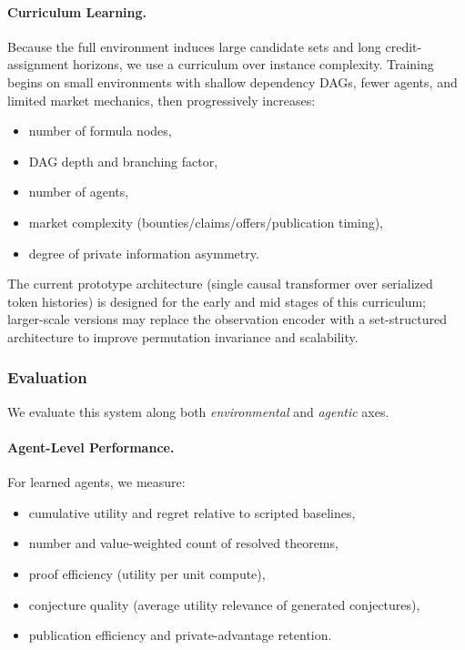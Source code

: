 \documentclass[letterpaper]{article} %
\begin{document}
\paragraph{Curriculum Learning.}
Because the full environment induces large candidate sets and long credit-assignment horizons, we use a curriculum over instance complexity. Training begins on small environments with shallow dependency DAGs, fewer agents, and limited market mechanics, then progressively increases:
\begin{itemize}
    \item number of formula nodes,
    \item DAG depth and branching factor,
    \item number of agents,
    \item market complexity (bounties/claims/offers/publication timing),
    \item degree of private information asymmetry.
\end{itemize}
The current prototype architecture (single causal transformer over serialized token histories) is designed for the early and mid stages of this curriculum; larger-scale versions may replace the observation encoder with a set-structured architecture to improve permutation invariance and scalability.
\subsubsection{Evaluation}

We evaluate this system along both \emph{environmental} and \emph{agentic} axes.


\paragraph{Agent-Level Performance.}
For learned agents, we measure:
\begin{itemize}
    \item cumulative utility and regret relative to scripted baselines,
    \item number and value-weighted count of resolved theorems,
    \item proof efficiency (utility per unit compute),
    \item conjecture quality (average utility relevance of generated conjectures),
    \item publication efficiency and private-advantage retention.
\end{itemize}
\end{document}
